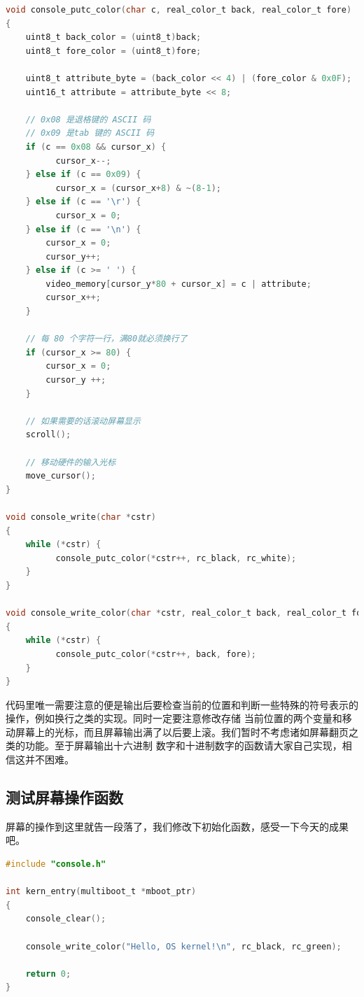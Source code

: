 \begin{lstlisting}[language = C, label = drivers/console.c, caption = drivers/console.c]
void console_putc_color(char c, real_color_t back, real_color_t fore)
{
	uint8_t back_color = (uint8_t)back;
	uint8_t fore_color = (uint8_t)fore;

	uint8_t attribute_byte = (back_color << 4) | (fore_color & 0x0F);
	uint16_t attribute = attribute_byte << 8;

	// 0x08 是退格键的 ASCII 码
	// 0x09 是tab 键的 ASCII 码
	if (c == 0x08 && cursor_x) {
	      cursor_x--;
	} else if (c == 0x09) {
	      cursor_x = (cursor_x+8) & ~(8-1);
	} else if (c == '\r') {
	      cursor_x = 0;
	} else if (c == '\n') {
		cursor_x = 0;
		cursor_y++;
	} else if (c >= ' ') {
		video_memory[cursor_y*80 + cursor_x] = c | attribute;
		cursor_x++;
	}

	// 每 80 个字符一行，满80就必须换行了
	if (cursor_x >= 80) {
		cursor_x = 0;
		cursor_y ++;
	}

	// 如果需要的话滚动屏幕显示
	scroll();

	// 移动硬件的输入光标
	move_cursor();
}

void console_write(char *cstr)
{
	while (*cstr) {
	      console_putc_color(*cstr++, rc_black, rc_white);
	}
}

void console_write_color(char *cstr, real_color_t back, real_color_t fore)
{
	while (*cstr) {
	      console_putc_color(*cstr++, back, fore);
	}
}
\end{lstlisting}

\par 代码里唯一需要注意的便是输出后要检查当前的位置和判断一些特殊的符号表示的操作，例如换行之类的实现。同时一定要注意修改存储\allowbreak
当前位置的两个变量和移动屏幕上的光标，而且屏幕输出满了以后要上滚。我们暂时不考虑诸如屏幕翻页之类的功能。至于屏幕输出十六进制\allowbreak
数字和十进制数字的函数请大家自己实现，相信这并不困难。

\subsection{测试屏幕操作函数}

\par 屏幕的操作到这里就告一段落了，我们修改下初始化函数，感受一下今天的成果吧。

\begin{lstlisting}[language = C, label = init/entry.c, caption = init/entry.c]
#include "console.h"

int kern_entry(multiboot_t *mboot_ptr)
{
	console_clear();

	console_write_color("Hello, OS kernel!\n", rc_black, rc_green);

	return 0;
}
\end{lstlisting}

